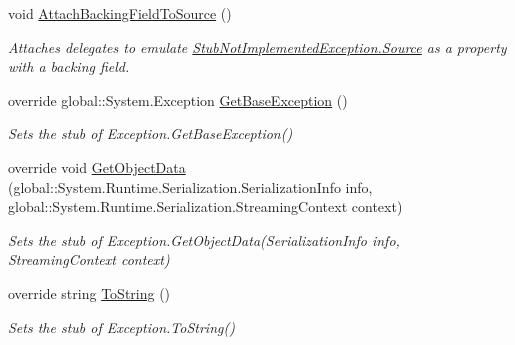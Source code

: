 \begin{DoxyCompactItemize}
void \hyperlink{class_system_1_1_fakes_1_1_stub_not_implemented_exception_a7129b4d976170c6e94e5b3c7a68dd7e5}{Attach\-Backing\-Field\-To\-Source} ()
\begin{DoxyCompactList}\small\item\em Attaches delegates to emulate \hyperlink{class_system_1_1_fakes_1_1_stub_not_implemented_exception_a4bc56d57a05ea403cdf545813ee6ff53}{Stub\-Not\-Implemented\-Exception.\-Source} as a property with a backing field.\end{DoxyCompactList}\item 
override global\-::\-System.\-Exception \hyperlink{class_system_1_1_fakes_1_1_stub_not_implemented_exception_acd520c4aa7bc708edb95301836796c3c}{Get\-Base\-Exception} ()
\begin{DoxyCompactList}\small\item\em Sets the stub of Exception.\-Get\-Base\-Exception()\end{DoxyCompactList}\item 
override void \hyperlink{class_system_1_1_fakes_1_1_stub_not_implemented_exception_aeab073704672355d3defb16475b129ef}{Get\-Object\-Data} (global\-::\-System.\-Runtime.\-Serialization.\-Serialization\-Info info, global\-::\-System.\-Runtime.\-Serialization.\-Streaming\-Context context)
\begin{DoxyCompactList}\small\item\em Sets the stub of Exception.\-Get\-Object\-Data(\-Serialization\-Info info, Streaming\-Context context)\end{DoxyCompactList}\item 
override string \hyperlink{class_system_1_1_fakes_1_1_stub_not_implemented_exception_a718d57afad5521a8dc05e51d65cef714}{To\-String} ()
\begin{DoxyCompactList}\small\item\em Sets the stub of Exception.\-To\-String()\end{DoxyCompactList}\end{DoxyCompactItemize}
